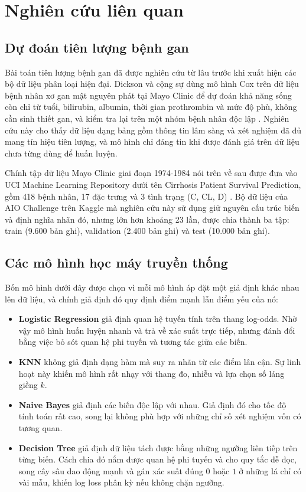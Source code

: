 \documentclass[12pt]{template/ai_conquer2026}
\begin{document}
\section{Nghiên cứu liên quan}

\subsection{Dự đoán tiên lượng bệnh gan}
\label{rw:liver}

Bài toán tiên lượng bệnh gan đã được nghiên cứu từ lâu trước khi xuất hiện các bộ
dữ liệu phân loại hiện đại. Dickson và cộng sự dùng mô hình Cox trên dữ liệu bệnh
nhân xơ gan mật nguyên phát tại Mayo Clinic để dự đoán khả năng sống còn chỉ từ
tuổi, bilirubin, albumin, thời gian prothrombin và mức độ phù, không cần sinh thiết
gan, và kiểm tra lại trên một nhóm bệnh nhân độc lập \cite{dickson1989prognosis}.
Nghiên cứu này cho thấy dữ liệu dạng bảng gồm thông tin lâm sàng và xét nghiệm đã
đủ mang tín hiệu tiên lượng, và mô hình chỉ đáng tin khi được đánh giá trên dữ liệu
chưa từng dùng để huấn luyện.

Chính tập dữ liệu Mayo Clinic giai đoạn 1974-1984 nói trên về sau được đưa vào UCI
Machine Learning Repository dưới tên Cirrhosis Patient Survival Prediction, gồm 418
bệnh nhân, 17 đặc trưng và 3 tình trạng (C, CL, D) \cite{dickson1989uci}. Bộ dữ liệu
của AIO Challenge trên Kaggle mà nghiên cứu này sử dụng giữ nguyên cấu trúc biến và
định nghĩa nhãn đó, nhưng lớn hơn khoảng 23 lần, được chia thành ba tập: train (9.600 bản ghi), validation (2.400 bản ghi) và test
(10.000 bản ghi).

\subsection{Các mô hình học máy truyền thống}
\label{rw:classic}

Bốn mô hình dưới đây được chọn vì mỗi mô hình áp đặt một giả định khác nhau lên
dữ liệu, và chính giả định đó quy định điểm mạnh lẫn điểm yếu của nó:

\begin{itemize}
  \item \textbf{Logistic Regression} giả định quan hệ tuyến tính trên thang
        log-odds. Nhờ vậy mô hình huấn luyện nhanh và trả về xác suất trực tiếp,
        nhưng đánh đổi bằng việc bỏ sót quan hệ phi tuyến và tương tác giữa các
        biến.
  \item \textbf{KNN} không giả định dạng hàm mà suy ra nhãn từ các điểm lân cận.
        Sự linh hoạt này khiến mô hình rất nhạy với thang đo, nhiễu và
        lựa chọn số láng giềng $k$.
  \item \textbf{Naive Bayes} giả định các biến độc lập với nhau. Giả định đó cho
        tốc độ tính toán rất cao, song lại không phù hợp với những chỉ số xét
        nghiệm vốn có tương quan.
  \item \textbf{Decision Tree} giả định dữ liệu tách được bằng những ngưỡng liên
        tiếp trên từng biến. Cách chia đó nắm được quan hệ phi tuyến và cho quy
        tắc dễ đọc, song cây sâu dao động mạnh và gán xác suất đúng $0$ hoặc $1$
        ở những lá chỉ có vài mẫu, khiến log loss phân kỳ nếu không chặn ngưỡng.
\end{itemize}
\end{document}
